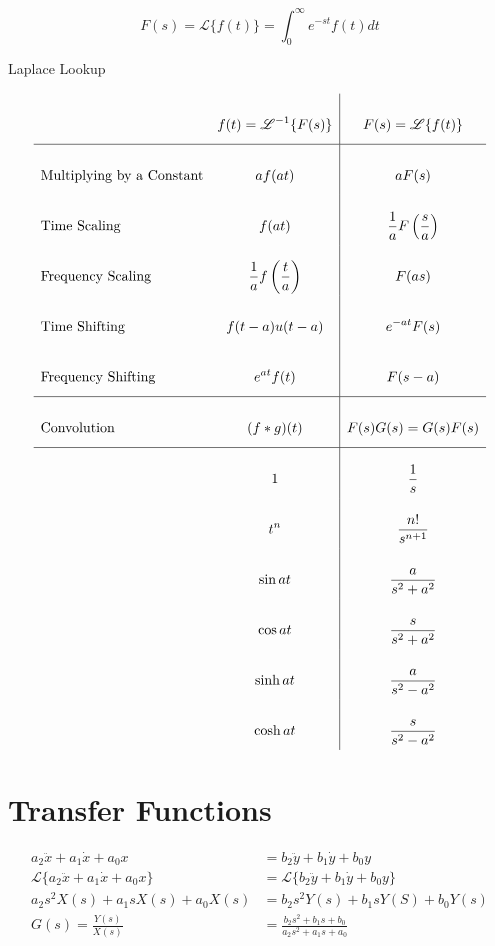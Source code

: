\documentclass{article}
\begin{document}
    \begin{equation}
        F(s) = \mathscr{L}\{f(t)\} = \int_0^\infty{e^{-st} f(t) dt}
    \end{equation}

    \begin{table}[h]
        \centering
        \caption{Laplace Lookup}
        $$\def\arraystretch{3}
        \begin{array}{>$l<$>{\displaystyle}c|>{\displaystyle}c}
            & f(t) = \mathscr{L}^{-1}\{F(s)\} & F(s) = \mathscr{L}\{f(t)\} \\
            \hline
            Multiplying by a Constant & af(at) & aF(s) \\
            Time Scaling & f(at) & \frac{1}{a}F\left(\frac{s}{a}\right) \\
            Frequency Scaling & \frac{1}{a}f\left(\frac{t}{a}\right) & F(as) \\
            Time Shifting & f(t - a)u(t - a) & e^{-at}F(s) \\
            Frequency Shifting & e^{at} f(t) & F(s - a) \\
            \hline
            Convolution & (f * g)(t) & F(s)G(s) = G(s)F(s) \\
            \hline
            & 1 & \frac{1}{s} \\
            & t^n & \frac{n!}{s^{n + 1}} \\
            & \sin{at} & \frac{a}{s^2 + a^2} \\
            & \cos{at} & \frac{s}{s^2 + a^2} \\
            & \sinh{at} & \frac{a}{s^2 - a^2} \\
            & \cosh{at} & \frac{s}{s^2 - a^2} \\
        \end{array}$$
    \end{table}

    \section{Transfer Functions}

    $$\begin{aligned}
        a_2\ddot{x} + a_1\dot{x} + a_0x &= b_2\ddot{y} + b_1\dot{y} + b_0y \\
        \mathscr{L}\{a_2\ddot{x} + a_1\dot{x} + a_0x\} &= \mathscr{L}\{b_2\ddot{y} + b_1\dot{y} + b_0y\} \\
        a_2s^2X(s) + a_1sX(s) + a_0X(s) &= b_2s^2Y(s) + b_1sY(S) + b_0Y(s) \\
        G(s) = \frac{Y(s)}{X(s)} &= \frac{b_2s^2 + b_1s + b_0}{a_2s^2 + a_1s + a_0} \\
    \end{aligned}$$
\end{document}
